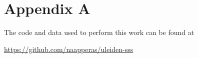\appendix

\section{Appendix A}

The code and data used to perform this work can be found at
\begin{center}
    \href{https://github.com/Naapperas/uleiden-sss/tree/main/assignments/2}{https://github.com/naapperas/uleiden-sss}
\end{center}


